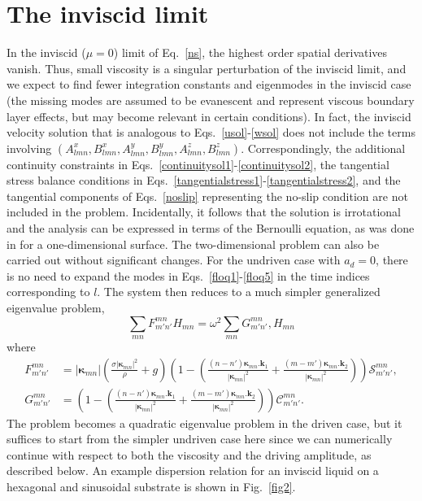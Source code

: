 \documentclass[aps,pre,amsmath,amssymb,floatfix,onecolumn,notitlepage,10pt]{revtex4-1}
\begin{document}
\section{The inviscid limit}
In the inviscid ($\mu=0$) limit of Eq.~\eqref{ns}, the highest order spatial derivatives vanish. Thus, small viscosity is a singular perturbation of the inviscid limit, and we expect to find fewer integration constants and eigenmodes in the inviscid case (the missing modes are assumed to be evanescent and represent viscous boundary layer effects, but may become relevant in certain conditions). In fact, the inviscid velocity solution that is analogous to Eqs.~\eqref{usol}-\eqref{wsol} does not include the terms involving $(A_{lmn}^x,B_{lmn}^x,A_{lmn}^y,B_{lmn}^y, A_{lmn}^z, B_{lmn}^z)$. Correspondingly, the additional continuity constraints in Eqs.~\eqref{continuitysol1}-\eqref{continuitysol2}, the tangential stress balance conditions in Eqs.~\eqref{tangentialstress1}-\eqref{tangentialstress2}, and the tangential components of Eqs.~\eqref{noslip} representing the no-slip condition are not included in the problem. Incidentally, it follows that the solution is irrotational and the analysis can be expressed in terms of the Bernoulli equation, as was done in \cite{2021_Nicolaou_1} for a one-dimensional surface. The two-dimensional problem can also be carried out without significant changes. For the undriven case with $a_d=0$, there is no need to expand the modes in Eqs.~\eqref{floq1}-\eqref{floq5} in the time indices corresponding to $l$. The system then reduces to a much simpler generalized eigenvalue problem,
\begin{equation}
\sum_{mn} F^{mn}_{m'n'} H_{mn} = \omega^2 \sum_{mn} G^{mn}_{m'n'}, H_{mn}
\end{equation}
where
\begin{align}
F^{mn}_{m'n'}&=\left| \bm{\kappa}_{mn}\right| \left(\frac{\sigma  \left| \bm{\kappa}_{mn}\right| ^2}{\rho }+g\right)  \left(1- \left(\frac{({n}-{n'}) \bm{\kappa}_{mn}.\mathbf{k}_1}{\left| \bm{\kappa}_{mn}\right| ^2}+\frac{({m}-{m'}) \bm{\kappa}_{mn}.\mathbf{k}_2}{\left| \bm{\kappa}_{mn}\right| ^2}\right)\right) \mathcal{S}^{mn}_{m'n'}, \\
G^{mn}_{m'n'}&=  \left(1- \left(\frac{({n}-{n'}) \bm{\kappa}_{mn}.\mathbf{k}_1}{\left| \bm{\kappa}_{mn}\right| ^2}+\frac{({m}-{m'}) \bm{\kappa}_{mn}.\mathbf{k}_2}{\left| \bm{\kappa}_{mn}\right| ^2}\right)\right) \mathcal{C}^{mn}_{m'n'}.
\end{align}
The problem becomes a quadratic eigenvalue problem in the driven case, but it suffices to start from the simpler undriven case here since we can numerically continue with respect to both the viscosity and the driving amplitude, as described below. An example dispersion relation for an inviscid liquid on a hexagonal and sinusoidal substrate is shown in Fig.~\ref{fig2}.
\end{document}
